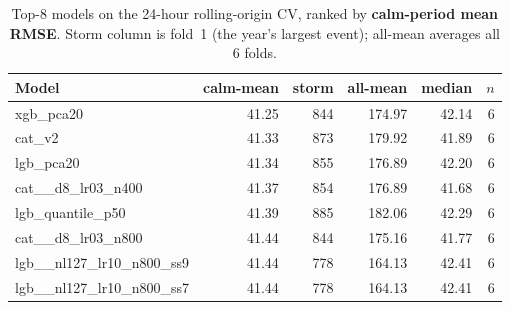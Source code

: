 \begin{table}[ht]
\centering
\caption{Top-8 models on the 24-hour rolling-origin CV, ranked by \textbf{calm-period mean RMSE}. Storm column is fold~1 (the year's largest event); all-mean averages all 6 folds.}
\label{tab:cv24}
\small
\begin{tabular}{lrrrrr}
\toprule
Model & calm-mean & storm & all-mean & median & $n$ \\
\midrule
  xgb\_pca20 & 41.25 & 844 & 174.97 & 42.14 & 6 \\
  cat\_v2 & 41.33 & 873 & 179.92 & 41.89 & 6 \\
  lgb\_pca20 & 41.34 & 855 & 176.89 & 42.20 & 6 \\
  cat\_\_d8\_lr03\_n400 & 41.37 & 854 & 176.89 & 41.68 & 6 \\
  lgb\_quantile\_p50 & 41.39 & 885 & 182.06 & 42.29 & 6 \\
  cat\_\_d8\_lr03\_n800 & 41.44 & 844 & 175.16 & 41.77 & 6 \\
  lgb\_\_nl127\_lr10\_n800\_ss9 & 41.44 & 778 & 164.13 & 42.41 & 6 \\
  lgb\_\_nl127\_lr10\_n800\_ss7 & 41.44 & 778 & 164.13 & 42.41 & 6 \\
\bottomrule
\end{tabular}
\end{table}
